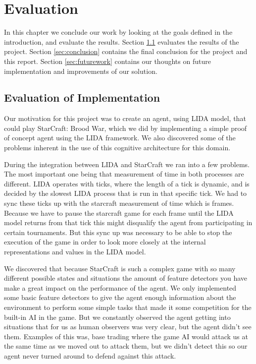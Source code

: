 
\chapter{Evaluation}
In this chapter we conclude our work by looking at the goals defined in the
introduction, and evaluate the results.
Section \ref{sec:evalres} evaluates the results of the project.
Section \ref{sec:conclusion} contains the final conclusion for the project and this report. 
Section \ref{sec:futurework} contains our thoughts on future implementation and improvements of our solution.

\section{Evaluation of Implementation}
\label{sec:evalres}
Our motivation for this project was to create an agent, using LIDA model, that could play StarCraft: Brood War, which we did by implementing a simple proof of concept agent using the LIDA framework. We also discovered some of the problems inherent in the use of this cognitive architecture for this domain.

During the integration between LIDA and StarCraft we ran into a few problems. The most important one being that measurement of time in both processes are different. LIDA operates with ticks, where the length of a tick is dynamic, and is decided by the slowest LIDA process that is run in that specific tick. We had to sync these ticks up with the starcraft measurement  of time which is frames. Because we have to pause the starcraft game for each frame until the LIDA model returns from that tick this might disqualify the agent from participating in certain tournaments. But this sync up was necessary to be able to stop the execution of the game in order to look more closely at the internal representations and values in the LIDA model.

We discovered that because StarCraft is such a complex game with so many different possible states and situations the amount of feature detectors you have make a great impact on the performance of the agent. We only implemented some basic feature detectors to give the agent enough information about the environment to perform some simple tasks that made it some competition for the built-in AI in the game. But we constantly observed the agent getting into situations that for us as human observers was very clear, but the agent didn't see them. Examples of this was, base trading where the game AI would attack us at the same time as we moved out to attack them, but we didn't detect this so our agent never turned around to defend against this attack.

